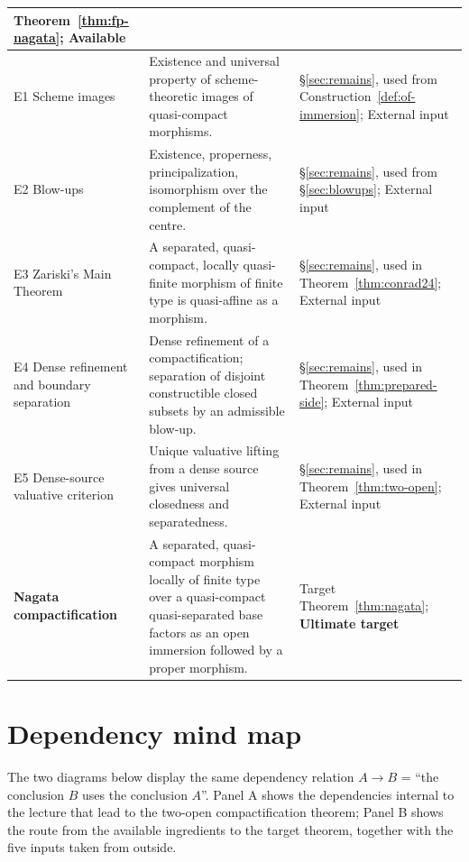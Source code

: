 \documentclass[11pt,a4paper]{article}
\theoremstyle{plain}
\theoremstyle{definition}
\theoremstyle{remark}
\newcommand{\qcqs}{quasi-compact quasi-separated}
\begin{document}
{\begin{longtable}{@{}L{3.05cm}L{8.75cm}L{3.35cm}@{}}
Theorem~\ref{thm:fp-nagata}; Available\\
\midrule
E1 Scheme images & Existence and universal property of scheme-theoretic images of quasi-compact morphisms. & \S\ref{sec:remains}, used from Construction~\ref{def:of-immersion}; External input\\
E2 Blow-ups & Existence, properness, principalization, isomorphism over the complement of the centre. & \S\ref{sec:remains}, used from \S\ref{sec:blowups}; External input\\
E3 Zariski's Main Theorem & A separated, quasi-compact, locally quasi-finite morphism of finite type is quasi-affine as a morphism. & \S\ref{sec:remains}, used in Theorem~\ref{thm:conrad24}; External input\\
E4 Dense refinement and boundary separation & Dense refinement of a compactification; separation of disjoint constructible closed subsets by an admissible blow-up. & \S\ref{sec:remains}, used in Theorem~\ref{thm:prepared-side}; External input\\
E5 Dense-source valuative criterion & Unique valuative lifting from a dense source gives universal closedness and separatedness. & \S\ref{sec:remains}, used in Theorem~\ref{thm:two-open}; External input\\
\midrule
\textbf{Nagata compactification} &
A separated, quasi-compact morphism locally of finite type over a \qcqs{} base factors as an open immersion followed by a proper morphism. &
Target Theorem~\ref{thm:nagata}; \textbf{Ultimate target}\\
\end{longtable}
}

\medskip
\section{Dependency mind map}
\label{sec:mindmap}

The two diagrams below display the same dependency relation
$A\to B$ = ``the conclusion $B$ uses the conclusion $A$''. Panel A shows the
dependencies internal to the lecture that lead to the two-open compactification
theorem; Panel B shows the route from the available ingredients to the target
theorem, together with the five inputs taken from outside.
\end{document}
